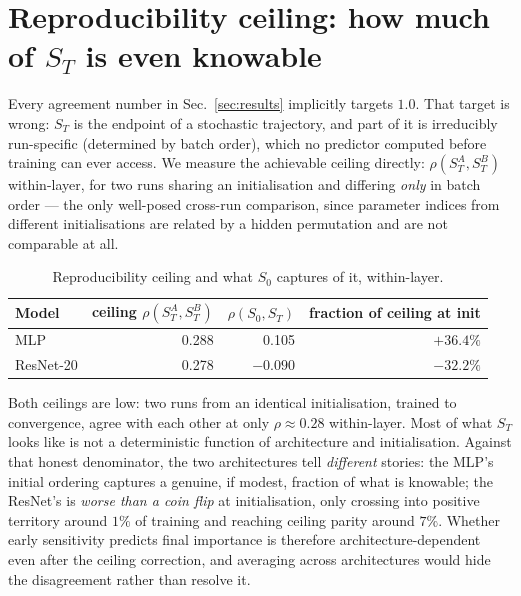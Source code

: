 \documentclass{article}
\begin{document}
\section{Reproducibility ceiling: how much of $S_T$ is even knowable}
\label{sec:ceiling}

Every agreement number in Sec.~\ref{sec:results} implicitly targets $1.0$. That target is
wrong: $S_T$ is the endpoint of a stochastic trajectory, and part of it is irreducibly
run-specific (determined by batch order), which no predictor computed before training can
ever access. We measure the achievable ceiling directly: $\rho(S_T^A, S_T^B)$ within-layer,
for two runs sharing an initialisation and differing \emph{only} in batch order --- the only
well-posed cross-run comparison, since parameter indices from different initialisations are
related by a hidden permutation and are not comparable at all.

\begin{table}[h]
  \caption{Reproducibility ceiling and what $S_0$ captures of it, within-layer.}
  \label{tab:ceiling}
  \centering
  \small
  \begin{tabular}{lrrr}
    \toprule
    Model & ceiling $\rho(S_T^A,S_T^B)$ & $\rho(S_0,S_T)$ & fraction of ceiling at init \\
    \midrule
    MLP       & 0.288 & 0.105  & $+36.4\%$ \\
    ResNet-20 & 0.278 & $-0.090$ & $-32.2\%$ \\
    \bottomrule
  \end{tabular}
\end{table}

Both ceilings are low: two runs from an identical initialisation, trained to convergence,
agree with each other at only $\rho\approx0.28$ within-layer. Most of what $S_T$ looks like
is not a deterministic function of architecture and initialisation. Against that honest
denominator, the two architectures tell \emph{different} stories: the MLP's initial
ordering captures a genuine, if modest, fraction of what is knowable; the ResNet's is
\emph{worse than a coin flip} at initialisation, only crossing into positive territory
around $1\%$ of training and reaching ceiling parity around $7\%$. Whether early sensitivity
predicts final importance is therefore architecture-dependent even after the ceiling
correction, and averaging across architectures would hide the disagreement rather than
resolve it.
\end{document}
